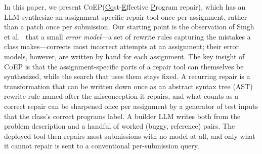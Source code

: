 \documentclass[acmsmall,screen,review,anonymous,nonacm]{acmart}
\newcommand{\tool}{\textsc{CoEP}\xspace}
\begin{document}
In this paper, we present \tool (\underline{Co}st-\underline{E}ffective \underline{P}rogram repair), which has an LLM synthesize an assignment-specific repair tool once per assignment, rather than a patch once per submission. Our starting point is the observation of Singh et al.~\cite{singh2013automated} that a small \emph{error model}---a set of rewrite rules capturing the mistakes a class makes---corrects most incorrect attempts at an assignment; their error models, however, are written by hand for each assignment. The key insight of \tool is that the assignment-specific parts of a repair tool can themselves be synthesized, while the search that uses them stays fixed. A recurring repair is a transformation that can be written down once as an abstract syntax tree (AST) rewrite rule named after the misconception it repairs, and what counts as a correct repair can be sharpened once per assignment by a generator of test inputs that the class's correct programs label. A builder LLM writes both from the problem description and a handful of worked (buggy, reference) pairs. The deployed tool then repairs most submissions with no model at all, and only what it cannot repair is sent to a conventional per-submission query.
\end{document}
